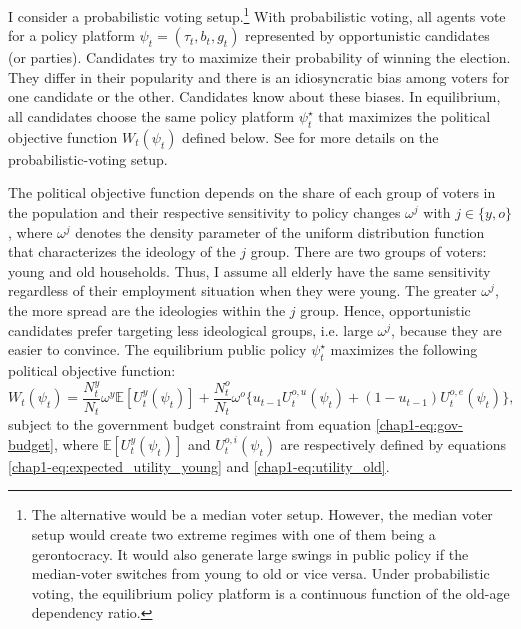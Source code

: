 I consider a probabilistic voting setup.\footnote{The alternative would be a median voter setup. However, the median voter setup would create two extreme regimes with one of them being a gerontocracy. It would also generate large swings in public policy if the median-voter switches from young to old or vice versa. Under probabilistic voting, the equilibrium policy platform is a continuous function of the old-age dependency ratio.} With probabilistic voting, all agents vote for a policy platform $\psi_t = (\tau_t, b_t, g_t)$ represented by opportunistic candidates (or parties). Candidates try to maximize their probability of winning the election. They differ in their popularity and there is an idiosyncratic bias among voters for one candidate or the other. Candidates know about these biases. In equilibrium, all candidates choose the same policy platform $\psi_t^\star$ that maximizes the political objective function $W_t(\psi_t)$ defined below. See \citet{Lindbeck1987Balanced} for more details on the probabilistic-voting setup.

The political objective function depends on the share of each group of voters in the population and their respective sensitivity to policy changes $\omega^j$ with $j\in \{y,o\}$, where $\omega^j$ denotes the density parameter of the uniform distribution function that characterizes the ideology of the $j$ group. 
There are two groups of voters: young and old households. Thus, I assume all elderly have the same sensitivity regardless of their employment situation when they were young.
The greater $\omega^j$, the more spread are the ideologies within the $j$ group. 
Hence, opportunistic candidates prefer targeting less ideological groups, i.e. large $\omega^j$, because they are easier to convince.
The equilibrium public policy $\psi_t^\star$ maximizes the following political objective function:
\begin{equation*}
	W_t(\psi_t) = \frac{N_t^y}{N_t} \omega^y \mathbb{E}\left[U_t^y(\psi_t)\right] + \frac{N_t^o}{N_t} \omega^o \Big\{ u_{t-1} U_t^{o,u}(\psi_t) + (1-u_{t-1}) U_t^{o,e}(\psi_t) \Big\},
\end{equation*}
subject to the government budget constraint from equation \eqref{chap1-eq:gov-budget}, where $\mathbb{E}\left[U_t^y(\psi_t)\right]$ and $U_t^{o,i}(\psi_t)$ are respectively defined by equations \eqref{chap1-eq:expected_utility_young} and \eqref{chap1-eq:utility_old}.

